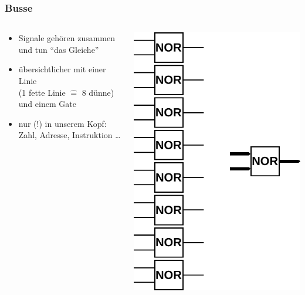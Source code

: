 \documentclass[t,aspectratio=169]{beamer}
\begin{document}
\begin{frame}
  \frametitle{Busse}

  \begin{columns}[T]
    \begin{column}{.45\textwidth}
      \begin{itemize}
      \item Signale gehören zusammen und tun \enquote{das Gleiche}
      \item übersichtlicher mit einer Linie\\
        (1 fette Linie $\hat=$ 8 dünne)\\
        und einem Gate
      \item nur (!) in unserem Kopf:\\
        Zahl, Adresse, Instruktion \ldots
      \end{itemize}
    \end{column}

    \begin{column}{.45\textwidth}
      \centering\includegraphics[height=.75\textheight]{nor-bus.pdf}
    \end{column}
  \end{columns}
\end{frame}
\end{document}
